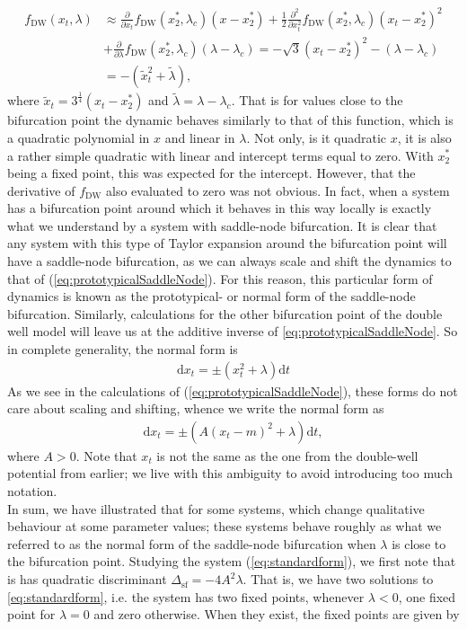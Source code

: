 \begin{align}
    f_{\mathrm{DW}}(x_t,\lambda)&\approx \frac{\partial}{\partial x_t}f_{\mathrm{DW}}(x_2^*,\lambda_c)(x-x_2^*) + \frac{1}{2}\frac{\partial^2}{\partial x_t^2}f_{\mathrm{DW}}(x_2^*,\lambda_c)(x_t-x_2^*)^2 \nonumber \\
     &+ \frac{\partial}{\partial \lambda}f_{\mathrm{DW}}(x_2^*,\lambda_c)(\lambda - \lambda_c) = -\sqrt{3}\left(x_t-x_2^*\right)^2 - \left(\lambda - \lambda_c\right) \nonumber \\&= -\left(\tilde{x}_t^2 + \tilde{\lambda}\right), \label{eq:prototypicalSaddleNode}
\end{align}
where $\tilde{x}_t = 3^{\frac{1}{4}}\left(x_t-x_2^*\right)$ and  $\tilde{\lambda} = \lambda - \lambda_c$. That is for values close to the bifurcation point the dynamic behaves similarly to that of this function, which is a quadratic polynomial in $x$ and linear in $\lambda$. Not only, is it quadratic $x$, it is also a rather simple quadratic with linear and intercept terms equal to zero. With $x_2^*$ being a fixed point, this was expected for the intercept. However, that the derivative of $f_{\mathrm{DW}}$ also evaluated to zero was not obvious. In fact, when a system has a bifurcation point around which it behaves in this way locally is exactly what we understand by a system with saddle-node bifurcation. It is clear that any system with this type of Taylor expansion around the bifurcation point will have a saddle-node bifurcation, as we can always scale and shift the dynamics to that of (\ref{eq:prototypicalSaddleNode}). For this reason, this particular form of dynamics is known as the prototypical- or normal form of the saddle-node bifurcation. Similarly, calculations for the other bifurcation point of the double well model will leave us at the additive inverse of \ref{eq:prototypicalSaddleNode}. So in complete generality, the normal form is
\begin{align}
    \mathrm{d}x_t = \pm\left(x_t^2 + \lambda\right)\mathrm{d}t
\end{align} 
As we see in the calculations of (\ref{eq:prototypicalSaddleNode}), these forms do not care about scaling and shifting, whence we write the normal form as
\begin{align}
    \mathrm{d}x_t = \pm\left(A\left(x_t - m\right)^2 + \lambda\right)\mathrm{d}t, \label{eq:standardform}
\end{align}
where $A>0$. Note that $x_t$ is not the same as the one from the double-well potential from earlier; we live with this ambiguity to avoid introducing too much notation.\\ In sum, we have illustrated that for some systems, which change qualitative behaviour at some parameter values; these systems behave roughly as what we referred to as the normal form of the saddle-node bifurcation when $\lambda$ is close to the bifurcation point. Studying the system (\ref{eq:standardform}), we first note that is has quadratic discriminant $\Delta_{\mathrm{sf}} = -4A^2\lambda$. That is, we have two solutions to \ref{eq:standardform}, i.e. the system has two fixed points, whenever $\lambda<0$, one fixed point for $\lambda = 0$ and zero otherwise. When they exist, the fixed points are given by
